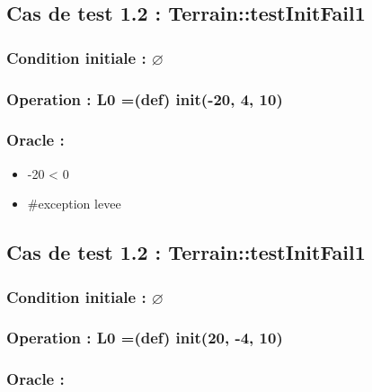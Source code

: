 \documentclass[11pt]{article}
\begin{document}
\subsection{Cas de test 1.2 : Terrain::testInitFail1}
\label{sec-1.2}

\subsubsection{Condition initiale : $\varnothing$}
\label{sec-1.2.1}

\subsubsection{Operation : L0 =(def) init(-20, 4, 10)}
\label{sec-1.2.2}

\subsubsection{Oracle :}
\label{sec-1.2.3}

\begin{itemize}

\item -20 < 0\\
\label{sec-1.2.3.1}


\item \#exception levee\\
\label{sec-1.2.3.2}


\end{itemize} %
\subsection{Cas de test 1.2 : Terrain::testInitFail1}
\label{sec-1.3}

\subsubsection{Condition initiale : $\varnothing$}
\label{sec-1.3.1}

\subsubsection{Operation : L0 =(def) init(20, -4, 10)}
\label{sec-1.3.2}

\subsubsection{Oracle :}
\label{sec-1.3.3}
\end{document}
